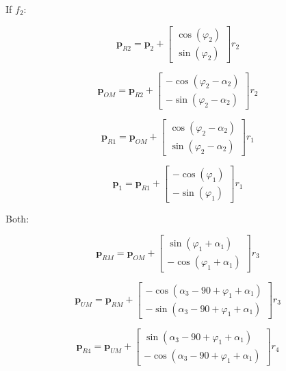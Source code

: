 \documentclass[10pt,a4paper]{article}
\begin{document}
\begin{multicols}{2}
If $f_2$:

\begin{equation}
\bm{p}_{R2} = \bm{p}_{2} + 
\begin{bmatrix} 
\cos(\varphi_2) \\ 
\sin(\varphi_2)
\end{bmatrix} r_2
\end{equation}

\begin{equation}
\bm{p}_{OM} = \bm{p}_{R2} + 
\begin{bmatrix} 
-\cos(\varphi_2-\alpha_2) \\ 
-\sin(\varphi_2-\alpha_2)
\end{bmatrix} r_2
\end{equation}

\begin{equation}
\bm{p}_{R1} = \bm{p}_{OM} + 
\begin{bmatrix} 
\cos(\varphi_2-\alpha_2) \\ 
\sin(\varphi_2-\alpha_2)
\end{bmatrix} r_1
\end{equation}

\begin{equation}
\bm{p}_{1} = \bm{p}_{R1} + 
\begin{bmatrix} 
-\cos(\varphi_1) \\ 
-\sin(\varphi_1)
\end{bmatrix} r_1
\end{equation}


Both:

\begin{equation}
\bm{p}_{RM} = \bm{p}_{OM} + \begin{bmatrix} 
\sin(\varphi_1 + \alpha_1) \\ 
-\cos(\varphi_1 + \alpha_1) \end{bmatrix} r_3
\end{equation}


\begin{equation}
\bm{p}_{UM} = \bm{p}_{RM} + \begin{bmatrix} 
- \cos(\alpha_3 - 90 + \varphi_1 + \alpha_1) \\ 
- \sin(\alpha_3 - 90 + \varphi_1 + \alpha_1) \end{bmatrix} r_3
\end{equation}

\begin{equation}
\bm{p}_{R4} = \bm{p}_{UM} + \begin{bmatrix} 
\sin(\alpha_3 - 90 + \varphi_1 + \alpha_1) \\
- \cos(\alpha_3 - 90 + \varphi_1 + \alpha_1) \end{bmatrix} r_4
\end{equation}


\end{multicols}
\end{document}

